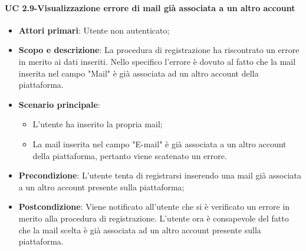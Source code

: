          \paragraph{UC 2.9-Visualizzazione errore di mail già associata a un altro account}
            \begin{itemize}
                \item \textbf{Attori primari}: Utente non autenticato;
                \item \textbf{Scopo e descrizione}: La procedura di registrazione ha riscontrato un errore in merito ai
                dati inseriti. Nello specifico l'errore è dovuto al fatto che la mail inserita nel campo "Mail" è già associata ad un altro account della piattaforma.
                \item \textbf{Scenario principale}: 
                    \begin{itemize}
                        \item L'utente ha inserito la propria mail;
                        \item La mail inserita nel campo "E-mail" è già associata a un altro account della piattaforma, pertanto viene scatenato un errore.
                    \end{itemize}
                \item \textbf{Precondizione}: L'utente tenta di registrarsi inserendo una mail già associata a un altro account presente sulla piattaforma;
                 \item \textbf{Postcondizione}: Viene notificato all'utente che si è verificato un errore in merito
                alla procedura di registrazione. L'utente ora è consapevole del fatto che la mail scelta è già associata ad un altro account presente sulla piattaforma.
            \end{itemize}
            
            
            
            
